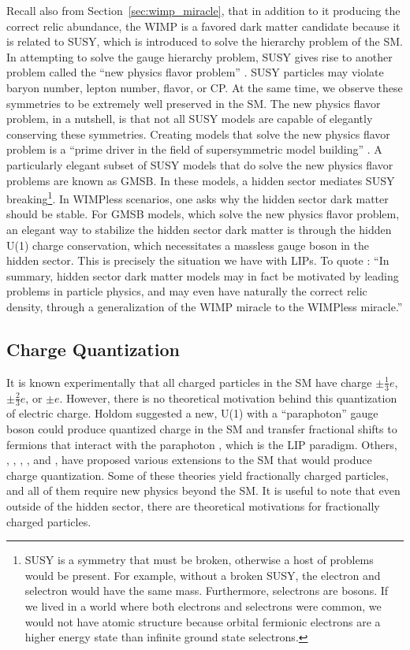 Recall also from Section~\ref{sec:wimp_miracle}, that in addition to it producing the correct relic abundance, the \ac{WIMP} is a favored dark matter candidate because it is related to \ac{SUSY}, which is introduced to solve the hierarchy problem of the \ac{SM}. In attempting to solve the gauge hierarchy problem, \ac{SUSY} gives rise to another problem called the ``new physics flavor problem'' \cite{Feng2010}. \ac{SUSY} particles may violate baryon number, lepton number, flavor, or CP. At the same time, we observe these symmetries to be extremely well preserved in the \ac{SM}. The new physics flavor problem, in a nutshell, is that not all \ac{SUSY} models are capable of elegantly conserving these symmetries. Creating models that solve the new physics flavor problem is a ``prime driver in the field of supersymmetric model building'' \cite{Feng2010}.  A particularly elegant subset of \ac{SUSY} models that do solve the new physics flavor problems are known as \ac{GMSB}. In these models, a hidden sector mediates \ac{SUSY} breaking\footnote{\ac{SUSY} is a symmetry that must be broken, otherwise a host of problems would be present. For example, without a broken \ac{SUSY}, the electron and selectron would have the same mass. Furthermore, selectrons are bosons. If we lived in a world where both electrons and selectrons were common, we would not have atomic structure because orbital fermionic electrons are a higher energy state than infinite ground state selectrons.}. In \ac{WIMP}less scenarios, one asks why the hidden sector dark matter should be stable. For \ac{GMSB} models, which solve the new physics flavor problem, an elegant way to stabilize the hidden sector dark matter is through the hidden U(1) charge conservation, which necessitates a massless gauge boson in the hidden sector. This is precisely the situation we have with \ac{LIP}s. To quote \cite{Feng2010}: ``In summary, hidden sector dark matter models may in fact be motivated by leading problems in particle physics, and may even have naturally the correct relic density, through a generalization of the \ac{WIMP} miracle to the \ac{WIMP}less miracle.''

\subsection{Charge Quantization}
It is known experimentally that all charged particles in the \ac{SM} have charge $\pm\frac{1}{3}e$, $\pm\frac{2}{3}e$, or $\pm e$. However, there is no theoretical motivation behind this quantization of electric charge. Holdom suggested a new, U(1) with a ``paraphoton'' gauge boson could produce quantized charge in the \ac{SM} and transfer fractional shifts to fermions that interact with the paraphoton \cite{Holdom1986}, which is the \ac{LIP} paradigm. Others, \cite{Foote1993}, \cite{Babu1990}, \cite{Schellekens1990}, \cite{Wen1985}, and \cite{Dirac1931}, have proposed various extensions to the \ac{SM} that would produce charge quantization. Some of these theories yield fractionally charged particles, and all of them require new physics beyond the \ac{SM}. It is useful to note that even outside of the hidden sector, there are theoretical motivations for fractionally charged particles. 


